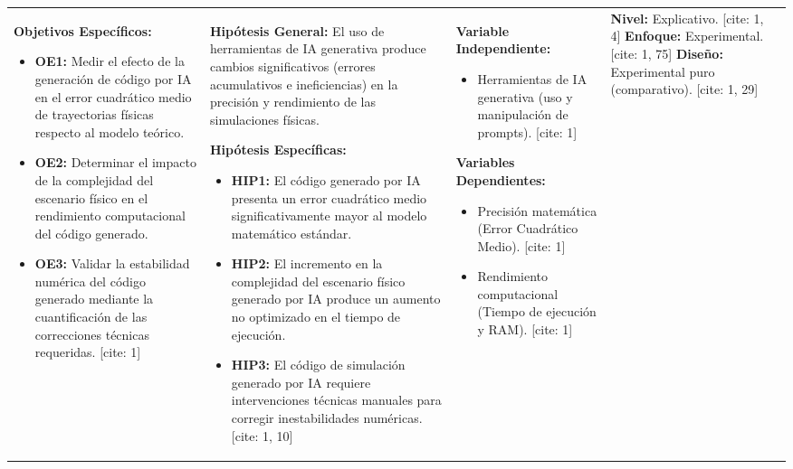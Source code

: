 \begin{landscape}
\begin{tabularx}{\linewidth}{|Y|Y|Y|Y|Y|}
\textbf{Objetivos Específicos:}
\begin{itemize}[leftmargin=*, nosep, itemsep=6pt]
    \item \textbf{OE1:} Medir el efecto de la generación de código por IA en el error cuadrático medio de trayectorias físicas respecto al modelo teórico. 
    \item \textbf{OE2:} Determinar el impacto de la complejidad del escenario físico en el rendimiento computacional del código generado. 
    \item \textbf{OE3:} Validar la estabilidad numérica del código generado mediante la cuantificación de las correcciones técnicas requeridas. [cite: 1]
\end{itemize} 
& 
\textbf{Hipótesis General:} \newline
El uso de herramientas de IA generativa produce cambios significativos (errores acumulativos e ineficiencias) en la precisión y rendimiento de las simulaciones físicas.  \newline

\textbf{Hipótesis Específicas:}
\begin{itemize}[leftmargin=*, nosep, itemsep=6pt]
    \item \textbf{HIP1:} El código generado por IA presenta un error cuadrático medio significativamente mayor al modelo matemático estándar. 
    \item \textbf{HIP2:} El incremento en la complejidad del escenario físico generado por IA produce un aumento no optimizado en el tiempo de ejecución. 
    \item \textbf{HIP3:} El código de simulación generado por IA requiere intervenciones técnicas manuales para corregir inestabilidades numéricas. [cite: 1, 10]
\end{itemize} 
& 
\textbf{Variable Independiente:}
\begin{itemize}[leftmargin=*, nosep]
    \item Herramientas de IA generativa (uso y manipulación de prompts). [cite: 1]
\end{itemize}

\textbf{Variables Dependientes:}
\begin{itemize}[leftmargin=*, nosep]
    \item Precisión matemática (Error Cuadrático Medio). [cite: 1]
    \item Rendimiento computacional (Tiempo de ejecución y RAM). [cite: 1]
\end{itemize} 
& 
\textbf{Nivel:} Explicativo. [cite: 1, 4] \newline
\textbf{Enfoque:} Experimental. [cite: 1, 75] \newline
\textbf{Diseño:} Experimental puro (comparativo). [cite: 1, 29] \newline


\end{tabularx}
\end{landscape}
